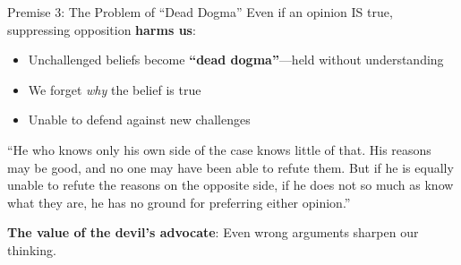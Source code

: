 ﻿\documentclass[aspectratio=169,11pt]{beamer}
\begin{document}
\begin{frame}{Premise 3: The Problem of ``Dead Dogma''}
Even if an opinion IS true, suppressing opposition \textbf{harms us}:

\begin{itemize}
    \item Unchallenged beliefs become \textbf{``dead dogma''}---held without understanding
    \item We forget \textit{why} the belief is true
    \item Unable to defend against new challenges
\end{itemize}

\vspace{0.3cm}
\begin{quotebox}[Mill]
``He who knows only his own side of the case knows little of that. His reasons may be good, and no one may have been able to refute them. But if he is equally unable to refute the reasons on the opposite side, if he does not so much as know what they are, he has no ground for preferring either opinion.''
\end{quotebox}

\vspace{0.2cm}
\textbf{The value of the devil's advocate}: Even wrong arguments sharpen our thinking.
\end{frame}
\end{document}
